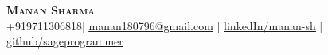 \documentclass[]{resume-openfont}
\begin{document}
\newcommand{\yourName}{Manan Sharma}
\newcommand{\yourEmail}{manan180796@gmail.com}
\newcommand{\yourPhone}{+919711306818}
\newcommand{\githubUserName}{sageprogrammer}
\newcommand{\linkedInUserName}{manan-sh}


\begin{center}
    \textbf{\Huge \scshape \yourName} \\ \vspace{1pt}
    \small \yourPhone $|$ \href{mailto:\yourEmail}{\underline{\yourEmail}} $|$ 
    \href{https://linkedin.com/in/\linkedInUserName}{\underline{linkedIn/\linkedInUserName}} $|$
    \href{https://github.com/\githubUserName}{\underline{github/\githubUserName}}
\end{center}


\end{document}
